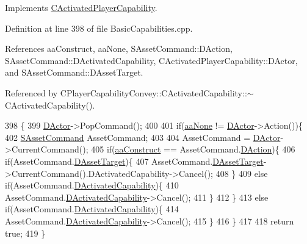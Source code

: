 Implements \hyperlink{classCActivatedPlayerCapability_a943b5999a57504399293250382c0ec6a}{C\+Activated\+Player\+Capability}.



Definition at line 398 of file Basic\+Capabilities.\+cpp.



References aa\+Construct, aa\+None, S\+Asset\+Command\+::\+D\+Action, S\+Asset\+Command\+::\+D\+Activated\+Capability, C\+Activated\+Player\+Capability\+::\+D\+Actor, and S\+Asset\+Command\+::\+D\+Asset\+Target.



Referenced by C\+Player\+Capability\+Convey\+::\+C\+Activated\+Capability\+::$\sim$\+C\+Activated\+Capability().


\begin{DoxyCode}
398                                                                \{
399     \hyperlink{classCActivatedPlayerCapability_a54ca944b47bff2718330639941d402b0}{DActor}->PopCommand();
400     
401     \textcolor{keywordflow}{if}(\hyperlink{GameDataTypes_8h_ab47668e651a3032cfb9c40ea2d60d670ac17cc5a0035320c060d7f8074143b507}{aaNone} != \hyperlink{classCActivatedPlayerCapability_a54ca944b47bff2718330639941d402b0}{DActor}->Action())\{
402         \hyperlink{structSAssetCommand}{SAssetCommand} AssetCommand;
403         
404         AssetCommand = \hyperlink{classCActivatedPlayerCapability_a54ca944b47bff2718330639941d402b0}{DActor}->CurrentCommand();
405         \textcolor{keywordflow}{if}(\hyperlink{GameDataTypes_8h_ab47668e651a3032cfb9c40ea2d60d670a7ef6b863f66dd7dcc95a199cd758ae1d}{aaConstruct} == AssetCommand.\hyperlink{structSAssetCommand_a8edd3b3d59a76d5514ba403bc8076a75}{DAction})\{
406             \textcolor{keywordflow}{if}(AssetCommand.\hyperlink{structSAssetCommand_a3d9b43f6e59c386c48c41a65448a0c39}{DAssetTarget})\{
407                 AssetCommand.\hyperlink{structSAssetCommand_a3d9b43f6e59c386c48c41a65448a0c39}{DAssetTarget}->CurrentCommand().DActivatedCapability->Cancel();
408             \}
409             \textcolor{keywordflow}{else} \textcolor{keywordflow}{if}(AssetCommand.\hyperlink{structSAssetCommand_ad8beda19520811cc70fe1eab16c774dd}{DActivatedCapability})\{
410                 AssetCommand.\hyperlink{structSAssetCommand_ad8beda19520811cc70fe1eab16c774dd}{DActivatedCapability}->Cancel();
411             \}
412         \}
413         \textcolor{keywordflow}{else} \textcolor{keywordflow}{if}(AssetCommand.\hyperlink{structSAssetCommand_ad8beda19520811cc70fe1eab16c774dd}{DActivatedCapability})\{
414             AssetCommand.\hyperlink{structSAssetCommand_ad8beda19520811cc70fe1eab16c774dd}{DActivatedCapability}->Cancel();
415         \}
416     \}
417     
418     \textcolor{keywordflow}{return} \textcolor{keyword}{true};
419 \}
\end{DoxyCode}
